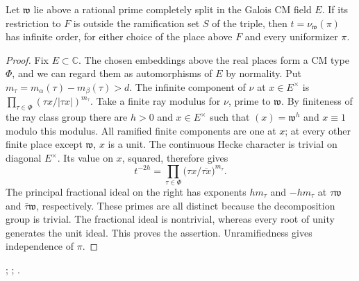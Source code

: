 \begin{lemma}\label{split:ray}
Let \(\mathfrak w\) lie above a rational prime completely split in the
Galois CM field \(E\). If its restriction to \(F\) is outside the
ramification set \(S\) of the triple, then
\(t=\nu_{\mathfrak w}(\pi)\) has infinite order, for either choice of
the place above \(F\) and every uniformizer \(\pi\).
\end{lemma}
\begin{proof}
Fix \(E\subset\mathbb C\). The chosen embeddings above the real places
form a CM type \(\Phi\), and we can regard them as automorphisms of
\(E\) by normality. Put \(m_\tau=m_\alpha(\tau)-m_\beta(\tau)>d\).
The infinite component of \(\nu\) at \(x\in E^\times\) is
\(\prod_{\tau\in\Phi}(\tau x/|\tau x|)^{m_\tau}\).
Take a finite ray modulus for \(\nu\), prime to \(\mathfrak w\).
By finiteness of the ray class group there are \(h>0\) and \(x\in
E^\times\) such that \((x)=\mathfrak w^h\) and \(x\equiv1\) modulo
this modulus. All ramified finite components are one at \(x\);
at every other finite place except \(\mathfrak w\), \(x\) is a unit.
The continuous Hecke character is trivial on diagonal \(E^\times\).
Its value on \(x\), squared, therefore gives
\[
 t^{-2h}=\prod_{\tau\in\Phi}
            \bigl(\tau x/\overline{\tau x}\bigr)^{m_\tau}.
\]
The principal fractional ideal on the right has exponents \(hm_\tau\)
and \(-hm_\tau\) at \(\tau\mathfrak w\) and
\(\bar\tau\mathfrak w\), respectively. These primes are all distinct
because the decomposition group is trivial. The fractional ideal is
nontrivial, whereas every root of unity generates the unit ideal.
This proves the assertion. Unramifiedness gives independence of \(\pi\).
\end{proof}
;
;
.

